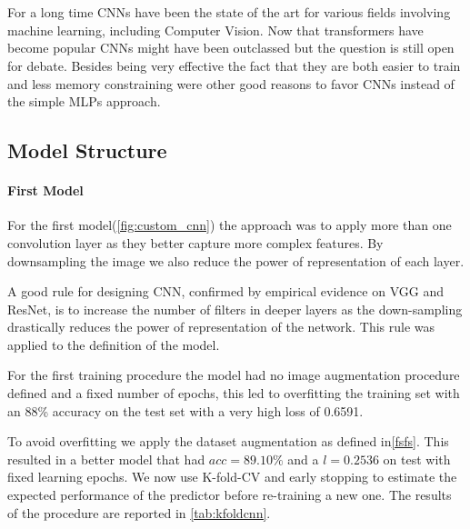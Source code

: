 \\

\paragraph{}
For a long time CNNs have been the state of the art for various fields involving machine learning, including Computer Vision.
Now that transformers have become popular CNNs might have been outclassed but the question is still open for debate.\cite{wang2023cnns}
Besides being very effective the fact that they are both easier to train and less memory constraining were other good reasons
to favor CNNs instead of the simple MLPs approach.

\subsection{Model Structure}

\paragraph{First Model}
For the first model(\ref{fig:custom_cnn}) the approach was to apply more than one convolution layer as they better
capture more complex features. By downsampling the image we also reduce the power of representation of each layer.

A good rule for designing CNN, confirmed by empirical evidence on VGG and ResNet, is to increase the number of filters
in deeper layers as the down-sampling drastically reduces the power of representation of the network.
This rule was applied to the definition of the model.

For the first training procedure the model had no image augmentation procedure defined and a fixed number of epochs, this
led to overfitting the training set with an 88\% accuracy on the test set with a very high loss of 0.6591.

To avoid overfitting we apply the dataset augmentation as defined in\ref{fsfs}.
This resulted in a better model that had $acc=89.10\%$ and a $l=0.2536$ on test with fixed learning epochs.
We now use K-fold-CV and early stopping to estimate the expected performance of the predictor before re-training a new one.
The results of the procedure are reported in \ref{tab:kfoldcnn}.


